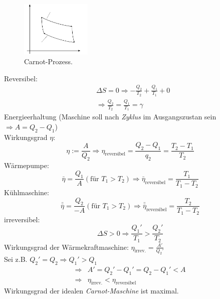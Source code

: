 \begin{enumerate}
    \begin{figure}[H]
        \begin{center}
            \includegraphics[width=0.3\textwidth]{../img/carnotprocess.pdf}
            \caption{Carnot-Prozess.}
            \label{img:carnot}
        \end{center}
    \end{figure}
    
    Reversibel:
    \begin{equation}
        \begin{split}
            & \Delta S = 0 \Rightarrow - \frac{Q_2}{T_2} + \frac{Q_1}{T_1} + 0  \\
            & \Rightarrow \frac{Q_2}{T_2} = \frac{Q_1}{T_1} = \gamma
        \end{split}
    \end{equation}
    Energieerhaltung (Maschine soll nach \emph{Zyklus} im Ausgangszustan sein $\Rightarrow A = Q_2 - Q_1$) \\
    Wirkungsgrad $\eta$:
    \begin{equation}
        \eta := \frac{A}{Q_2} \Rightarrow \eta_{\text{reversibel}} = \frac{Q_2 - Q_1}{q_2} = \frac{T_2 - T_1}{T_2}
    \end{equation}
    Wärmepumpe:
    \begin{equation}
        \bar{\eta} = \frac{Q_1}{A} (\text{für } T_1 > T_2) \Rightarrow \bar{\eta}_{\text{reversibel}} = \frac{T_1}{T_1 - T_2}
    \end{equation}
    Kühlmaschine:
    \begin{equation}
        \bar{\bar{\eta}} = \frac{Q_2}{-A} (\text{für } T_1 > T_2) \Rightarrow \bar{\bar{\eta}}_{\text{reversibel}} = \frac{T_2}{T_1-T_2}
    \end{equation}
    irreversibel:
    \begin{equation}
        \Delta S > 0 \Rightarrow \frac{Q_1'}{T_1} > \frac{Q_2'}{T_2}
    \end{equation}
    Wirkungsgrad der Wärmekraftmaschine: $\eta_{\text{irrev.}} = \frac{A'}{Q_2'}$ \\
    Sei z.B. $Q_2' = Q_2 \Rightarrow Q_1' > Q_1$
    \begin{equation}
        \begin{split}
            \Rightarrow & A' = Q_2' - Q_1' = Q_2 - Q_1' < A \\
            \Rightarrow & \eta_\text{irrev.} < \eta_\text{reversibel}
        \end{split}
    \end{equation}
    Wirkungsgrad der idealen \emph{Carnot-Maschine} ist maximal.
\end{enumerate}

